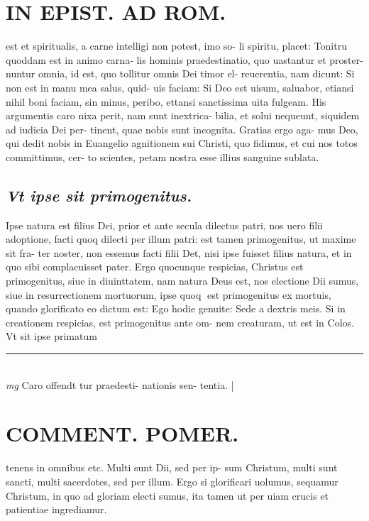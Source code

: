 \documentclass{article}
\begin{document}
\begin{pages}
\section*{IN EPIST. AD ROM.  }
\marginpar{[ p.101 ]}\pstart est et spiritualis, a carne intelligi non potest, imo so- li spiritu, placet: Tonitru quoddam est in animo carna- lis hominis praedestinatio, quo uastantur et proster- nuntur omnia, id est, quo tollitur omnis Dei timor el- reuerentia, nam dicunt: Si non est in manu mea salus, quid- uis faciam: Si Deo est uisum, saluabor, etiansi nihil boni faciam, sin minus, peribo, ettansi sanctissima uita fulgeam. His argumentis caro nixa perit, nam sunt inextrica- bilia, et solui nequeunt, siquidem ad iudicia Dei per- tinent, quae nobis sunt incognita. Gratias ergo aga- mus Deo, qui dedit nobis in Euangelio agnitionem sui Christi, quo fidimus, et cui nos totos committimus, cer- to scientes, petam nostra esse illius sanguine sublata.  \pend
{}
{}
\subsection*{\textit{Vt ipse sit primogenitus. }}\pstart Ipse natura est filius Dei, prior et ante secula dilectus patri, nos uero filii adoptione, facti quoq dilecti per illum patri: est tamen primogenitus, ut maxime sit fra- ter noster, non essemus facti filii Det, nisi ipse fuisset filius natura, et in quo sibi complacuisset pater. Ergo quocunque respicias, Christus est primogenitus, siue in diuinttatem, nam natura Deus est, nos electione Dii sumus, siue in resurrectionem mortuorum, ipse quoq est primogenitus ex mortuis, quando glorificato eo dictum est: Ego hodie genuite: Sede a dextris meis.  Si in creationem respicias, est primogenitus ante om- nem creaturam, ut est in Colos. Vt sit ipse primatum  \pend
\vspace{0.5cm}\noindent
\vspace{0.2cm}\rule{1cm}{0.2pt}\\ 
\hspace{0.2cm}\textit{mg}
\footnotesize Caro offendt tur praedesti- nationis sen- tentia.  
\normalsize| 
\section*{COMMENT. POMER.  }\pstart tenens in omnibus etc. Multi sunt Dii, sed per ip- sum Christum, multi sunt sancti, multi sacerdotes, sed per illum. Ergo si glorificari uolumus, sequamur Christum, in quo ad gloriam electi sumus, ita tamen ut per uiam crucis et patientiae ingrediamur.  \pend
{}
{}

\end{pages}
\end{document}
